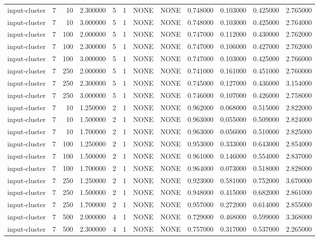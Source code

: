 \begin{tabular}{lrrrllllrrrr}
input-cluster & 7 & 10 & 2.300000 & 5 & 1 & NONE & NONE & 0.748000 & 0.103000 & 0.425000 & 2.765000 \\
input-cluster & 7 & 10 & 3.000000 & 5 & 1 & NONE & NONE & 0.748000 & 0.103000 & 0.425000 & 2.764000 \\
input-cluster & 7 & 100 & 2.000000 & 5 & 1 & NONE & NONE & 0.747000 & 0.112000 & 0.430000 & 2.762000 \\
input-cluster & 7 & 100 & 2.300000 & 5 & 1 & NONE & NONE & 0.747000 & 0.106000 & 0.427000 & 2.762000 \\
input-cluster & 7 & 100 & 3.000000 & 5 & 1 & NONE & NONE & 0.747000 & 0.103000 & 0.425000 & 2.766000 \\
input-cluster & 7 & 250 & 2.000000 & 5 & 1 & NONE & NONE & 0.741000 & 0.161000 & 0.451000 & 2.760000 \\
input-cluster & 7 & 250 & 2.300000 & 5 & 1 & NONE & NONE & 0.745000 & 0.127000 & 0.436000 & 3.154000 \\
input-cluster & 7 & 250 & 3.000000 & 5 & 1 & NONE & NONE & 0.746000 & 0.107000 & 0.426000 & 2.758000 \\
input-cluster & 7 & 10 & 1.250000 & 2 & 1 & NONE & NONE & 0.962000 & 0.068000 & 0.515000 & 2.822000 \\
input-cluster & 7 & 10 & 1.500000 & 2 & 1 & NONE & NONE & 0.963000 & 0.055000 & 0.509000 & 2.824000 \\
input-cluster & 7 & 10 & 1.700000 & 2 & 1 & NONE & NONE & 0.963000 & 0.056000 & 0.510000 & 2.825000 \\
input-cluster & 7 & 100 & 1.250000 & 2 & 1 & NONE & NONE & 0.953000 & 0.333000 & 0.643000 & 2.854000 \\
input-cluster & 7 & 100 & 1.500000 & 2 & 1 & NONE & NONE & 0.961000 & 0.146000 & 0.554000 & 2.837000 \\
input-cluster & 7 & 100 & 1.700000 & 2 & 1 & NONE & NONE & 0.964000 & 0.073000 & 0.518000 & 2.828000 \\
input-cluster & 7 & 250 & 1.250000 & 2 & 1 & NONE & NONE & 0.923000 & 0.581000 & 0.752000 & 3.670000 \\
input-cluster & 7 & 250 & 1.500000 & 2 & 1 & NONE & NONE & 0.948000 & 0.415000 & 0.682000 & 2.861000 \\
input-cluster & 7 & 250 & 1.700000 & 2 & 1 & NONE & NONE & 0.957000 & 0.272000 & 0.614000 & 2.855000 \\
input-cluster & 7 & 500 & 2.000000 & 4 & 1 & NONE & NONE & 0.729000 & 0.468000 & 0.599000 & 3.368000 \\
input-cluster & 7 & 500 & 2.300000 & 4 & 1 & NONE & NONE & 0.757000 & 0.317000 & 0.537000 & 2.265000 \\

\end{tabular}
